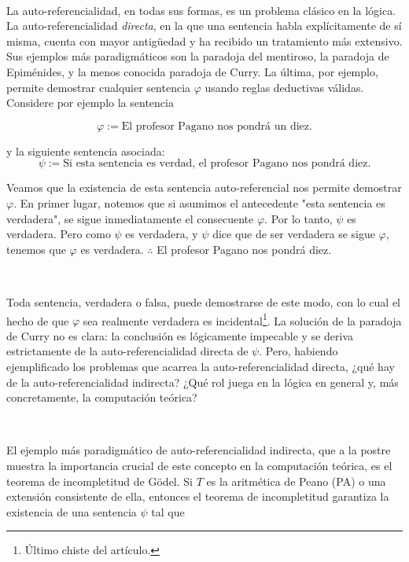 \documentclass[a4paper, 12pt]{article}
\begin{document}
~ 

La auto-referencialidad, en todas sus formas, es un problema clásico en la
lógica. La auto-referencialidad \textit{directa}, en la que una sentencia habla
explícitamente de sí misma, cuenta con mayor antigüedad y ha recibido un
tratamiento más extensivo. Sus ejemplos más paradigmáticos 
son la paradoja del mentiroso, la paradoja de Epiménides, y la menos conocida
paradoja de Curry. La última, por ejemplo, permite demostrar cualquier sentencia
$\varphi$ usando reglas deductivas válidas. Considere por ejemplo la sentencia 


\begin{equation*}
  \varphi := \text{El profesor Pagano nos pondrá un diez.}
\end{equation*}

y la siguiente sentencia asociada:
\begin{equation*}
  \psi := \text{Si esta sentencia es verdad, el profesor Pagano nos pondrá diez}.
\end{equation*}

Veamos que la existencia de esta sentencia auto-referencial nos permite
demostrar $\varphi$. En primer lugar, notemos que si asumimos el antecedente
"esta sentencia es verdadera", se sigue inmediatamente el consecuente $\varphi$.
Por lo tanto, $\psi$ es verdadera. Pero como $\psi$ es verdadera, y $\psi$ dice
que de ser verdadera se sigue $\varphi$, tenemos que $\varphi$ es verdadera.
$\therefore $ El profesor Pagano nos pondrá diez.

~ 

Toda sentencia, verdadera o falsa, puede demostrarse de este modo, con lo cual
el hecho de que $\varphi$ sea realmente verdadera es incidental\footnote{Último
chiste del artículo.}. La solución de la paradoja de Curry no es clara: la
conclusión es lógicamente impecable y se deriva estrictamente de la
auto-referencialidad directa de $\psi$. Pero, habiendo ejemplificado los
problemas que acarrea la auto-referencialidad directa, ¿qué hay de la
auto-referencialidad indirecta? ¿Qué rol juega en la lógica en general y, más
concretamente, la computación teórica?

~

El ejemplo más paradigmático de auto-referencialidad indirecta, que a la postre
muestra la importancia crucial de este concepto en la computación teórica, es el
teorema de incompletitud de Gödel.  Si $T$ es la aritmética de Peano (PA) o una
extensión consistente de ella, entonces el teorema de incompletitud garantiza la
existencia de una sentencia $\psi$ tal que
\end{document}
